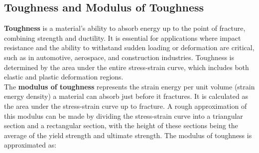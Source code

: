 \documentclass{article}
\begin{document}
    \newpage

\subsection{Toughness and Modulus of Toughness}

\textbf{Toughness} is a material's ability to absorb energy up to the point of fracture, combining strength and ductility. It is essential for applications where impact resistance and the ability to withstand sudden loading or deformation are critical, such as in automotive, aerospace, and construction industries. Toughness is determined by the area under the entire stress-strain curve, which includes both elastic and plastic deformation regions.\\[8pt]
The \textbf{modulus of toughness} represents the strain energy per unit volume (strain energy density) a material can absorb just before it fractures. It is calculated as the area under the stress-strain curve up to fracture. A rough approximation of this modulus can be made by dividing the stress-strain curve into a triangular section and a rectangular section, with the height of these sections being the average of the yield strength and ultimate strength. The modulus of toughness is approximated as:
\end{document}
